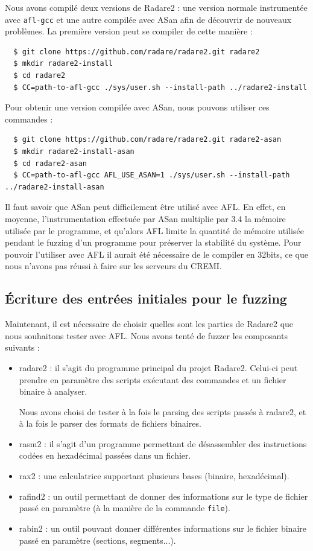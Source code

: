 Nous avons compilé deux versions de Radare2 : une version normale instrumentée avec \lstinline{afl-gcc} et une autre compilée avec ASan afin de découvrir de nouveaux problèmes.
La première version peut se compiler de cette manière :

\begin{lstlisting}
  $ git clone https://github.com/radare/radare2.git radare2
  $ mkdir radare2-install
  $ cd radare2
  $ CC=path-to-afl-gcc ./sys/user.sh --install-path ../radare2-install
\end{lstlisting}

Pour obtenir une version compilée avec ASan, nous pouvons utiliser ces commandes :

\begin{lstlisting}
  $ git clone https://github.com/radare/radare2.git radare2-asan
  $ mkdir radare2-install-asan
  $ cd radare2-asan
  $ CC=path-to-afl-gcc AFL_USE_ASAN=1 ./sys/user.sh --install-path ../radare2-install-asan
\end{lstlisting}

Il faut savoir que ASan peut difficilement être utilisé avec AFL.
En effet, en moyenne, l'instrumentation effectuée par ASan multiplie par 3.4 la mémoire utilisée par le programme\cite{asan}, et qu'alors AFL limite la quantité de mémoire utilisée pendant le fuzzing d'un programme pour préserver la stabilité du système.
Pour pouvoir l'utiliser avec AFL il aurait été nécessaire de le compiler en 32bits, ce que nous n'avons pas réussi à faire sur les serveurs du CREMI.

\subsection{Écriture des entrées initiales pour le fuzzing}

Maintenant, il est nécessaire de choisir quelles sont les parties de Radare2 que nous souhaitons tester avec AFL.
Nous avons tenté de fuzzer les composants suivants :

\begin{itemize}
\item radare2 : il s'agit du programme principal du projet Radare2.
  Celui-ci peut prendre en paramètre des scripts exécutant des commandes et un fichier binaire à analyser.

  Nous avons choisi de tester à la fois le parsing des scripts passés à radare2, et à la fois le parser des formats de fichiers binaires.
\item rasm2 : il s'agit d'un programme permettant de désassembler des instructions codées en hexadécimal passées dans un fichier.
\item rax2 : une calculatrice supportant plusieurs bases (binaire, hexadécimal).
\item rafind2 : un outil permettant de donner des informations sur le type de fichier passé en paramètre (à la manière de la commande \lstinline{file}).
\item rabin2 : un outil pouvant donner différentes informations sur le fichier binaire passé en paramètre (sections, segments...).
\end{itemize}


